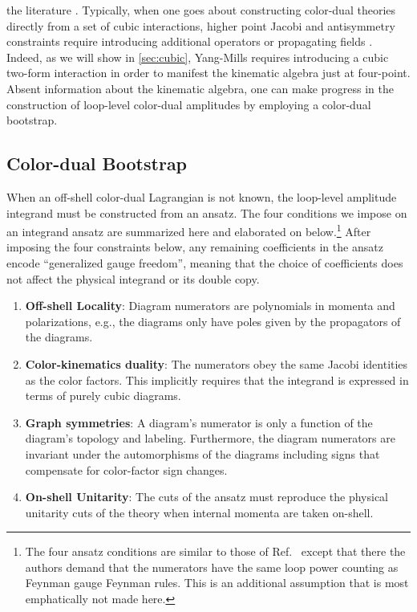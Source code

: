 \documentclass[11pt,letter]{article}
\begin{document}
the literature \cite{Monteiro2011pc, Cheung:2016prv, Cheung:2021zvb,
  Cheung:2020djz, Ben-Shahar:2022ixa, Ben-Shahar:2021zww,
  Ben-Shahar:2021doh}.
Typically, when one goes about constructing color-dual
theories directly from a set of cubic interactions, higher point
Jacobi and antisymmetry constraints require introducing additional operators \cite{Carrasco:2022lbm,Carrasco:2022sck} or propagating fields \cite{Ben-Shahar:2022ixa}.
Indeed, as we will show in \cref{sec:cubic}, Yang-Mills
requires introducing a cubic two-form interaction in order to manifest
the kinematic algebra just at four-point. Absent information about the
kinematic algebra, one can make progress in the construction of
loop-level color-dual amplitudes by employing a color-dual bootstrap.


\subsection{Color-dual Bootstrap}
\label{sec:bootstrap}

When an off-shell color-dual Lagrangian is not known, the loop-level
amplitude integrand must be constructed from an ansatz.  The four
conditions we impose on an integrand ansatz are summarized here and
elaborated on below.\footnote{The four ansatz conditions are similar
  to those of Ref.~\cite{Bern:2015ooa} except that there the authors
  demand that the numerators have the same loop power counting as
  Feynman gauge Feynman rules.  This is an additional assumption that
  is most emphatically not made here.}
After imposing the four constraints below, any remaining coefficients in the ansatz encode ``generalized gauge freedom'', meaning that the
choice of coefficients does not affect the physical integrand or its double copy.
\begin{enumerate}
\item \textbf{Off-shell Locality}: Diagram numerators are polynomials
  in momenta and polarizations, e.g., the diagrams only have poles given
  by the propagators of the diagrams.
\item \textbf{Color-kinematics duality}: The numerators obey the same
  Jacobi identities as the color factors.  This implicitly requires
  that the integrand is expressed in terms of purely cubic diagrams.
\item \textbf{Graph symmetries}: A diagram's numerator is only a
  function of the diagram's topology and labeling.  Furthermore, the
  diagram numerators are invariant under the automorphisms of the
  diagrams including signs that compensate for color-factor sign
    changes.
\item \textbf{On-shell Unitarity}: The cuts of the ansatz must
  reproduce the physical unitarity cuts of the theory when internal
  momenta are taken on-shell.
\end{enumerate}
\end{document}
